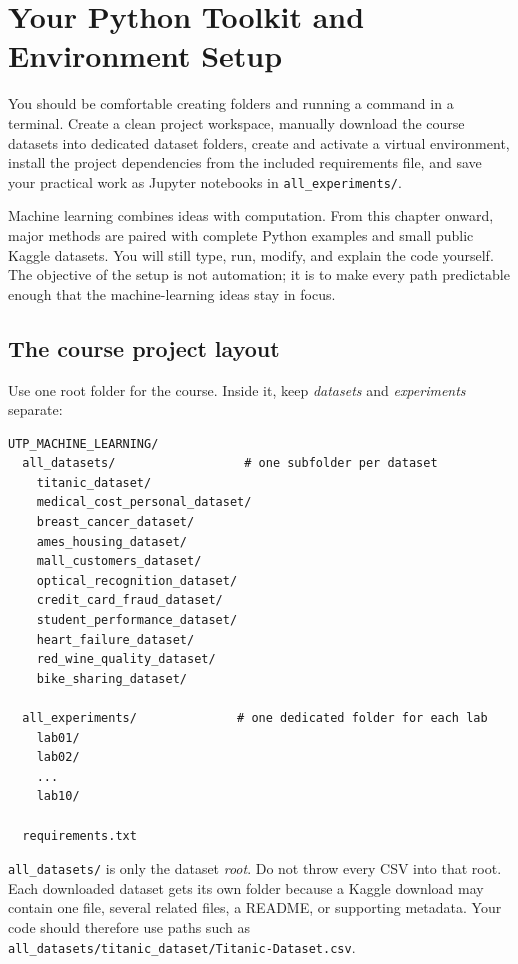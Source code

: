 \chapter{Your Python Toolkit and Environment Setup}
\label{ch:python}

\chapterguide%
  {You should be comfortable creating folders and running a command in a terminal.}
  {Create a clean project workspace, manually download the course datasets into dedicated dataset folders, create and activate a virtual environment, install the project dependencies from the included requirements file, and save your practical work as Jupyter notebooks in \texttt{all\_experiments/}.}

Machine learning combines ideas with computation. From this chapter onward, major methods are paired with complete Python examples and small public Kaggle datasets. You will still type, run, modify, and explain the code yourself. The objective of the setup is not automation; it is to make every path predictable enough that the machine-learning ideas stay in focus.

\section{The course project layout}

Use one root folder for the course. Inside it, keep \emph{datasets} and \emph{experiments} separate:

\begin{lstlisting}[style=mlterminal]
UTP_MACHINE_LEARNING/
  all_datasets/                  # one subfolder per dataset
    titanic_dataset/
    medical_cost_personal_dataset/
    breast_cancer_dataset/
    ames_housing_dataset/
    mall_customers_dataset/
    optical_recognition_dataset/
    credit_card_fraud_dataset/
    student_performance_dataset/
    heart_failure_dataset/
    red_wine_quality_dataset/
    bike_sharing_dataset/

  all_experiments/              # one dedicated folder for each lab
    lab01/
    lab02/
    ...
    lab10/

  requirements.txt
\end{lstlisting}

\begin{keyidea}
\texttt{all\_datasets/} is only the dataset \emph{root}. Do not throw every CSV into that root. Each downloaded dataset gets its own folder because a Kaggle download may contain one file, several related files, a README, or supporting metadata. Your code should therefore use paths such as \texttt{all\_datasets/titanic\_dataset/Titanic-Dataset.csv}.
\end{keyidea}

